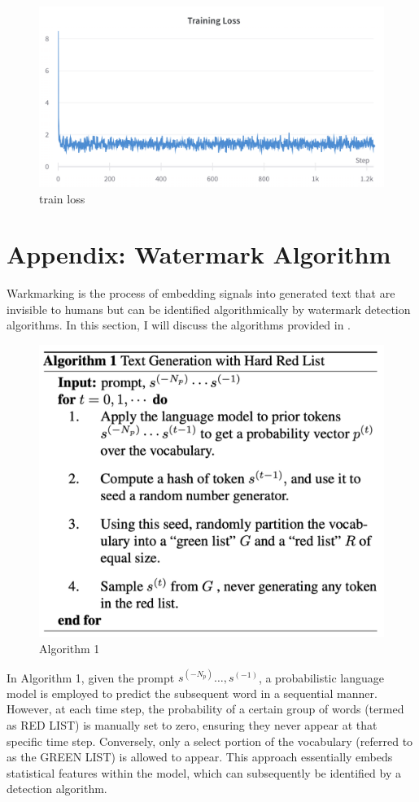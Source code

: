 \documentclass{article}
\begin{document}
\begin{figure}[H]
	\centering
	\includegraphics[width=1.0\linewidth]{images/train_loss}
	\caption{train loss}
	\label{fig:trainloss}
\end{figure}


\appendix
\section*{Appendix: Watermark Algorithm}
Warkmarking is the process of embedding signals into generated text that are invisible to humans but can be identified algorithmically by watermark detection algorithms.  In this section, I will discuss the algorithms provided in \cite{kirchenbauer2023watermark}.

\begin{figure}[H]
	\centering
	\includegraphics[width=1.0\linewidth]{images/watermark_1}
	\caption{Algorithm 1}
	\label{fig:watermark1}
\end{figure}
In Algorithm 1, given the prompt $ s^{(-N_p)}\dots, s^{(-1)} $, a probabilistic language model is employed to predict the subsequent word in a sequential manner. However, at each time step, the probability of a certain group of words (termed as RED LIST) is manually set to zero, ensuring they never appear at that specific time step. Conversely, only a select portion of the vocabulary (referred to as the GREEN LIST) is allowed to appear. This approach essentially embeds statistical features within the model, which can subsequently be identified by a detection algorithm. \\
\end{document}
